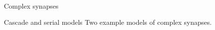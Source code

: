 \documentclass[final,hyperref={pdfpagelabels=false,bookmarks=false}]{beamer}
\begin{document}
\begin{frame}{}
\begin{columns}[t]
\begin{column}{0.26\linewidth}
\begin{block}{Complex synapses}
\begin{minipage}[t]{0.49\linewidth}
   \begin{center}
   \hspace{2cm}
   \end{center}
 \end{minipage}
%
\end{block}


\begin{block}{Cascade and serial models}
%
 Two example models of complex synapses.
 \begin{center}
  \hspace{2cm}
 \end{center}


\end{block}
\end{column}
\end{columns}
\end{frame}
\end{document}
